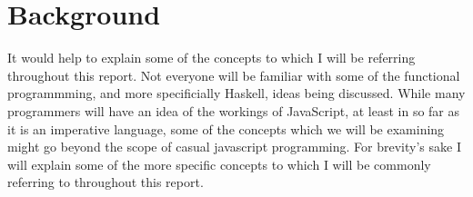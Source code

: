 
\section{Background}
It would help to explain some of the concepts to which I will be referring 
throughout this report. Not everyone will be familiar with some of the 
functional programmming, and more specificially Haskell, ideas being discussed.
While many programmers will have an idea of the workings of JavaScript, at
least in so far as it is an imperative language, some of the concepts which 
we will be examining might go beyond the scope of casual javascript programming.
For brevity's sake I will explain some of the more specific concepts to which 
I will be commonly referring to throughout this report.

\begin{comment}
\subsection{Types in Javascript}
**Is this really needed?**
\\
There are seven data types in javascript, five of which concern us for the purposes
of this project; three primary data types which are Number, String and Boolean, 
and two 'composite' data types, Objects and Arrays. When writing in straight
forward javascript, types are more or less invisible to the programmer. To declare
a variable, of any type, the usual format is...
\begin{verbatim}
var varname = value;
\end{verbatim}
The type of varname is inferred from the type of the value. The types of javascipt
objects are inferred from their attributes and methods. Types can be mixed
in operators and functions with some type coercion, which can be dangerous
if used incorrectly. The composite Object type will be most interest to us later,
when dealing with the javascript 'runtime' used both in our own implementation
and in that of the Fay language, which we will be looking at.

An important point to remember is that we can represent primitive objects as
composite objects, albeit it with a performance penalty. This idea will prove
significant later when dealing with lazy evaluation, where simple primitive
types will be insufficient to represent lazy evaluation.
\end{comment}


